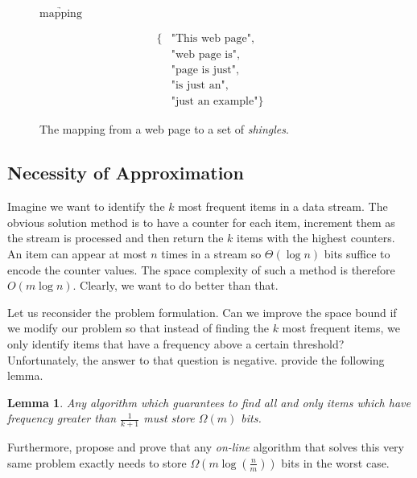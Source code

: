 \documentclass[a4paper]{article}
\newtheorem{mylemma}{Lemma}
\begin{document}
\begin{figure}[h]
\begin{center}
\hspace{1cm} $\underrightarrow{\text{mapping}}$ \hspace{1cm}
\parbox{2cm}{
\begin{equation*}
\begin{split}
 \text{\{} & \text{"This web page"},\\ & \text{"web page is"},\\ & \text{"page is just"},\\ & \text{"is just an"},\\ & \text{"just an example"} \text{\}}
\end{split}
\end{equation*}
}
\end{center}
\caption{The mapping from a web page to a set of \emph{shingles}.}
\label{fig:shingle}
\end{figure}
  
\subsection{Necessity of Approximation}
Imagine we want to identify the $k$ most frequent items in a data stream. The obvious solution method is to have a counter for each item, increment them as the stream is processed and then return the $k$ items with the highest counters. An item can appear at most $n$ times in a stream so $\Theta(\log n)$ bits suffice to encode the counter values. The space complexity of such a method is therefore $O(m \log n)$. Clearly, we want to do better than that.

Let us reconsider the problem formulation. Can we improve the space bound if we modify our problem so that instead of finding the $k$ most frequent items, we only identify items that have a frequency above a certain threshold? Unfortunately, the answer to that question is negative.  provide the following lemma.\\

\begin{mylemma}
Any algorithm which guarantees to find all and only items which have frequency greater than $\frac{1}{k + 1}$ must store $\Omega(m)$ bits.
\end{mylemma}

Furthermore, \cite{Karp:2003:SAF:762471.762473} propose and prove that any \textit{on-line} algorithm that solves this very same problem exactly needs to store $\Omega(m \log (\frac{n}{m}))$ bits in the worst case.
\end{document}
